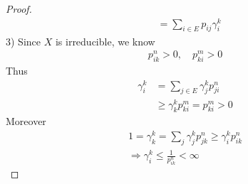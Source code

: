 \begin{proof}
\begin{align*}
		&= \sum_{i \in E} p_{ij} \gamma_i^k
	\end{align*}
	3)
	Since $X$ is irreducible, we know
	\begin{align*}
		p_{ik}^n > 0, \quad p_{ki}^m > 0
	\end{align*}
	Thus
	\begin{align*}
		\gamma_i^k &= \sum_{j \in E} \gamma_j^k p_{ji}^n \\
		&\ge \gamma_k^k p_{ki}^m = p_{ki}^m > 0
	\end{align*}
	Moreover
	\begin{align*}
		1 = \gamma_k^k = \sum_j \gamma_j^k p_{jk}^n \ge \gamma_i^k p_{ik}^n\\
		\Rightarrow \gamma_i^k \le \frac{1}{p_{ik}^n}< \infty
	\end{align*}
\end{proof}

